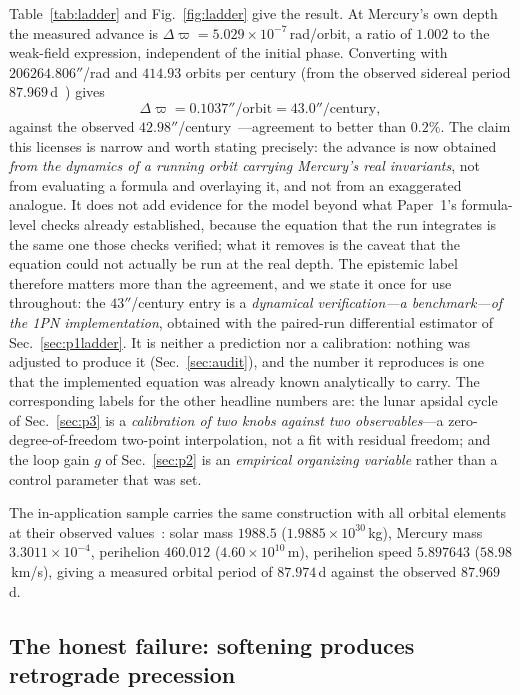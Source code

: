 \documentclass[aps,reprint,amsmath,amssymb,nofootinbib,superscriptaddress,floatfix]{revtex4-2}
\begin{document}
Table~\ref{tab:ladder} and Fig.~\ref{fig:ladder} give the result.
At Mercury's own depth the measured advance is
$\Delta\varpi=5.029\times10^{-7}$\,rad/orbit, a ratio of $1.002$ to
the weak-field expression, independent of the initial phase.
Converting with $206264.806''$/rad and $414.93$ orbits per century
(from the observed sidereal period $87.969$\,d~\cite{NASAFact}) gives
\begin{equation}
  \Delta\varpi = 0.1037''/\text{orbit} = 43.0''/\text{century},
  \label{eq:43}
\end{equation}
against the observed $42.98''$/century~\cite{Park2017}---agreement to
better than $0.2\%$.
The claim this licenses is narrow and worth stating precisely: the
advance is now obtained \emph{from the dynamics of a running orbit
carrying Mercury's real invariants}, not from evaluating a formula and
overlaying it, and not from an exaggerated analogue.
It does not add evidence for the model beyond what Paper~1's
formula-level checks already established, because the equation that the
run integrates is the same one those checks verified; what it removes
is the caveat that the equation could not actually be run at the real
depth.
The epistemic label therefore matters more than the agreement, and we
state it once for use throughout: the $43''$/century entry is a
\emph{dynamical verification---a benchmark---of the 1PN implementation},
obtained with the paired-run differential estimator of
Sec.~\ref{sec:p1ladder}.
It is neither a prediction nor a calibration: nothing was adjusted to
produce it (Sec.~\ref{sec:audit}), and the number it reproduces is one
that the implemented equation was already known analytically to carry.
The corresponding labels for the other headline numbers are:
the lunar apsidal cycle of Sec.~\ref{sec:p3} is a \emph{calibration of
two knobs against two observables}---a zero-degree-of-freedom two-point
interpolation, not a fit with residual freedom; and the loop gain $g$ of
Sec.~\ref{sec:p2} is an \emph{empirical organizing variable} rather than
a control parameter that was set.

The in-application sample carries the same construction with all
orbital elements at their observed values~\cite{Prsa2016,NASAFact}:
solar mass $1988.5$
($1.9885\times10^{30}$\,kg), Mercury mass $3.3011\times10^{-4}$,
perihelion $460.012$ ($4.60\times10^{10}$\,m), perihelion speed
$5.897643$ ($58.98$\,km/s), giving a measured orbital period of
$87.974$\,d against the observed $87.969$\,d.

\subsection{The honest failure: softening produces retrograde
  precession}
\label{sec:p1soft}
\end{document}
